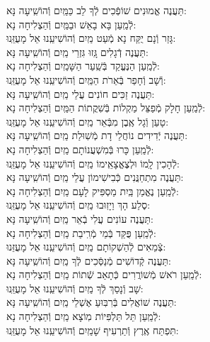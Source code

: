 \documentclass[twoside, openany, parskip=half, 11pt]{book}
\begin{document}
\begin{small}
תַּעֲנֶה אֱמוּנִים שׁוֹפְֿכִים לְֿךָ לֵב כַּמַּֽיִם \hfill וְֿהוֹשִֽׁיעָה נָּא:\\
לְֿמַֽעַן בָּא בָאֵשׁ וּבַמַּֽיִם \hfill וְֿהַצְלִיחָה נָא: \\
גָּזַר וְֿנָם יֻקַּח נָא מְֿעַט מַֽיִם \hfill וְֿהוֹשִׁיעֵֽנוּ אֵל מָעֻזֵּֽנוּ:\\
תַּעֲנֶה דְֿגָלִים גָּֽזוּ גִּזְרֵי מַֽיִם \hfill וְֿהוֹשִֽׁיעָה נָּא:\\
לְֿמַֽעַן הַנֶּעֱקַד בְּֿשַֽׁעַר הַשָּׁמַֽיִם \hfill וְֿהַצְלִיחָה נָא:\\
וְֿשָׁב וְֿחָפַר בְּֿאֵרֹת הַמַּֽיִם \hfill וְֿהוֹשִׁיעֵֽנוּ אֵל מָעֻזֵּֽנוּ:\\
תַּעֲנֶה זַכִּים חוֹנִים עֲלֵי מַֽיִם \hfill וְֿהוֹשִֽׁיעָה נָּא:\\
לְֿמַֽעַן חָלָק מְֿפַצֵּל מַקְלוֹת בְּֿשִׁקֲתוֹת הַמַּֽיִם \hfill וְֿהַצְלִיחָה נָא:\\
טָעַן וְֿגָל אֶֽבֶן מִבְּֿאֵר מַֽיִם \hfill וְֿהוֹשִׁיעֵֽנוּ אֵל מָעֻזֵּֽנוּ:\\
תַּעֲנֶה יְֿדִידִים נוֹחֲלֵי דָת מְֿשֽׁוּלַת מַֽיִם \hfill וְֿהוֹשִֽׁיעָה נָּא: \\
לְֿמַֽעַן כָּרוּ בְּֿמִשְׁעֲנוֹתָם מַֽיִם \hfill וְֿהַצְלִיחָה נָא:\\
לְֿהָכִין לָֽמוֹ וּלְצֶאֱצָאֵֽימוֹ מַֽיִם \hfill וְֿהוֹשִׁיעֵֽנוּ אֵל מָעֻזֵּֽנוּ:\\
תַּעֲנֶה מִתְחַנֲּנִים כְּֿבִישִׁימוֹן עֲלֵי מַֽיִם \hfill וְֿהוֹשִֽׁיעָה נָּא:\\
לְֿמַֽעַן נֶאֱמַן בַּֽיִת מַסְפִּיק לָעָם מַֽיִם \hfill וְֿהַצְלִיחָה נָא:\\
סֶלַע הָךְ וַיָזֽוּבוּ מַֽיִם \hfill וְֿהוֹשִׁיעֵֽנוּ אֵל מָעֻזֵּֽנוּ: \\
תַּעֲנֶה עוֹנִים עֲלִי בְֿאֵר מַֽיִם \hfill וְֿהוֹשִֽׁיעָה נָּא: \\
לְֿמַֽעַן פֻּקַּד בְּֿמֵי מְֿרִֽיבַת מַֽיִם \hfill וְֿהַצְלִיחָה נָא:\\
צְֿמֵאִים לְֿהַשְׁקוֹתָם מַֽיִם \hfill וְֿהוֹשִׁיעֵֽנוּ אֵל מָעֻזֵּנוּ: \\
תַּעֲנֶה קְֿדוֹשִׁים מְֿנַסְּֿכִים לְֿךָ מַֽיִם \hfill וְֿהוֹשִֽׁיעָה נָּא: \\
לְֿמַֽעַן רֹאשׁ מְֿשׁוֹרֲרִים כְּֿתָאַב שְֿׁתוֹת מַֽיִם \hfill וְֿהַצְלִיחָה נָא:\\
שָׁב וְֿנָסַךְ לְֿךָ מַֽיִם \hfill וְֿהוֹשִׁיעֵֽנוּ אֵל מָעֻזֵּֽנוּ:\\
תַּעֲנֶה שׁוֹאֲלִים בְּֿרִבּֽוּעַ אֶשְׁלֵי מַֽיִם \hfill וְֿהוֹשִֽׁיעָה נָּא: \\
לְֿמַֽעַן תֵּל תַּלְפִּיוֹת מֽוֹצָא מַֽיִם \hfill וְֿהַצְלִיחָה נָא:\\
תִּפְתַּח אֶֽרֶץ וְֿתַרְעִיף שָׁמַֽיִם \hfill וְֿהוֹשִׁיעֵֽנוּ אֵל מָעֻזֵּֽנוּ:

\end{small}
\end{document}
